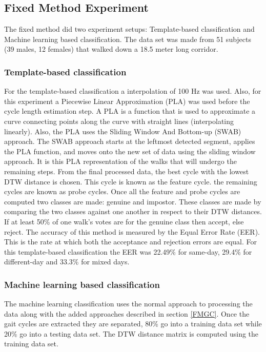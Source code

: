 \documentclass{sig-alternate}
\begin{document}
\subsection{Fixed Method Experiment}
	The fixed method did two experiment setups: Template-based classification and Machine learning based classification. The data set was made from 51 subjects (39 males, 12 females) that walked down a 18.5 meter long corridor.
			


\subsubsection{Template-based classification}
	 For the template-based classification a interpolation of 100 Hz was used. Also, for this experiment a Piecewise Linear Approximation (PLA) was used before the cycle length estimation step. A PLA is a function that is used to approximate a curve connecting points along the curve with straight lines (interpolating linearly). Also, the PLA uses the Sliding Window And Bottom-up (SWAB) approach. The SWAB approach starts at the leftmost detected segment, applies the PLA function, and moves onto the new set of data using the sliding window approach. It is this PLA representation of the walks that will undergo the remaining steps. From the final processed data, the best cycle with the lowest DTW distance is chosen. This cycle is known as the feature cycle. the remaining cycles are known as probe cycles. Once all the feature and probe cycles are computed two classes are made: genuine and impostor. These classes are made by comparing the two classes against one another in respect to their DTW distances. If at least 50\% of one walk's votes are for the genuine class then accept, else reject. The accuracy of this method is measured by the Equal Error Rate (EER). This is the rate at which both the acceptance and rejection errors are equal. For this template-based classification the EER was 22.49\% for same-day, 29.4\% for different-day and 33.3\% for mixed days. 
	 			
\subsubsection{Machine learning based classification}
The machine learning classification uses the normal approach to processing the data along with the added approaches described in section \ref{FMGC}. Once the gait cycles are extracted they are separated, 80\% go into a training data set while 20\% go into a testing data set. The DTW distance matrix is computed using the training data set. 
\end{document}
